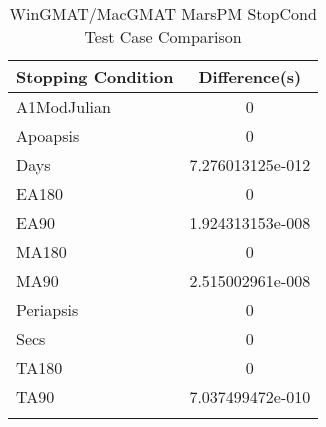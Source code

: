 \begin{table}[htbp!]
\centering
\caption{ WinGMAT/MacGMAT MarsPM StopCond Test Case Comparison}
      \begin{tabular}{lc}
      \hline\hline
          Stopping Condition & Difference(s) \\
         \hline
         A1ModJulian & 0 \\
         Apoapsis & 0 \\
         Days & 7.276013125e-012 \\
         EA180 & 0 \\
         EA90 & 1.924313153e-008 \\
         MA180 & 0 \\
         MA90 & 2.515002961e-008 \\
         Periapsis & 0 \\
         Secs & 0 \\
         TA180 & 0 \\
         TA90 & 7.037499472e-010 \\
      \hline\hline
      \label{Table: WinGMAT-MacGMAT MarsPM StopCond Table} 
\end{tabular}
\end{table}
